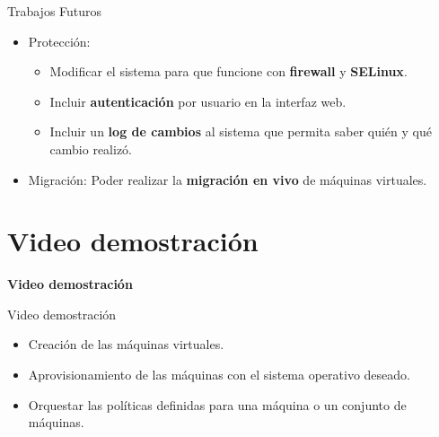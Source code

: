 \begin{frame}{Trabajos Futuros}
    \vspace{0cm}
    \begin{itemize}
        \item Protección: 
        \begin{itemize}
            \item  Modificar el sistema para que funcione con \textbf{firewall} y \textbf{SELinux}.
            \item  Incluir \textbf{autenticación} por usuario en la interfaz web.
            \item  Incluir un \textbf{log de cambios} al sistema que permita saber quién y qué cambio realizó.
        \end{itemize}
        \item Migración: Poder realizar la \textbf{migración en vivo} de máquinas virtuales.
        
    \end{itemize}

\end{frame}

\section{Video demostración}
\begin{frame}
    \Huge
    \centering
    \textbf{Video demostración}

\end{frame}

\begin{frame}{Video demostración}
    \vspace{0cm}
    \begin{itemize}
        \item Creación de las máquinas virtuales.
        \item Aprovisionamiento de las máquinas con el sistema operativo deseado.
        \item Orquestar las políticas definidas para una máquina o un conjunto de máquinas.
    \end{itemize}

\end{frame}


